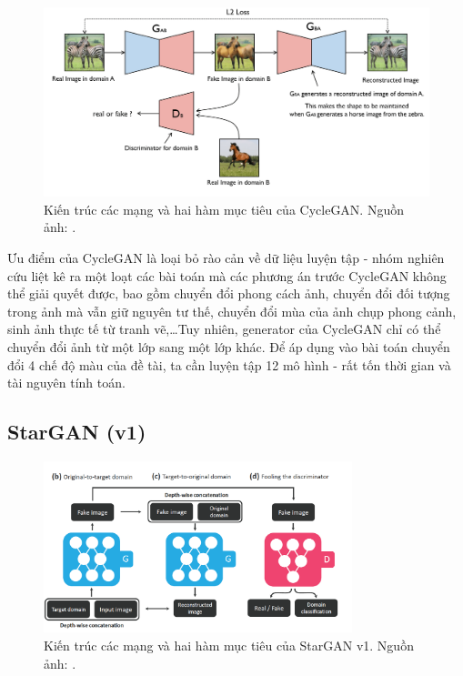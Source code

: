\documentclass[12pt]{extreport}
\begin{document}
\begin{figure}[H]
    \centering
    \includegraphics[width=\textwidth]{figure16}
    \caption{Kiến trúc các mạng và hai hàm mục tiêu của CycleGAN. Nguồn ảnh: \cite{mnistsvhntransfer}.}
\end{figure}

Ưu điểm của CycleGAN là loại bỏ rào cản về dữ liệu luyện tập - nhóm nghiên cứu liệt kê ra một loạt các bài toán mà các phương án trước CycleGAN không thể giải quyết được, bao gồm chuyển đổi phong cách ảnh, chuyển đổi đối tượng trong ảnh mà vẫn giữ nguyên tư thế, chuyển đổi mùa của ảnh chụp phong cảnh, sinh ảnh thực tế từ tranh vẽ,\dots Tuy nhiên, generator của CycleGAN chỉ có thể chuyển đổi ảnh từ một lớp sang một lớp khác. Để áp dụng vào bài toán chuyển đổi 4 chế độ màu của đề tài, ta cần luyện tập 12 mô hình - rất tốn thời gian và tài nguyên tính toán.

\subsection{StarGAN (v1)}

\begin{figure}[H]
    \centering
    \includegraphics[width=0.8\textwidth]{figure17}
    \caption{Kiến trúc các mạng và hai hàm mục tiêu của StarGAN v1. Nguồn ảnh: \cite{DBLP:journals/corr/abs-1711-09020}.}
\end{figure}
\end{document}
